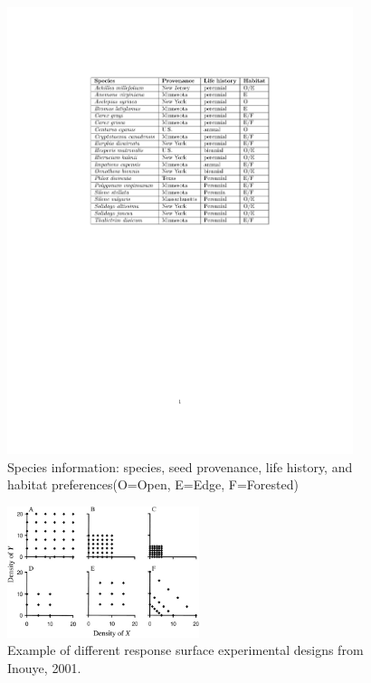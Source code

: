 \documentclass{article}\usepackage[]{graphicx}\usepackage[]{color}
\begin{document}
\begin{figure}[here]
\includegraphics[trim=50 400 50 100,clip,width=0.9\textwidth]{..//figures/species_table.pdf}
\caption{Species information: species, seed provenance, life history, and habitat preferences(O=Open, E=Edge, F=Forested)}
\label{fig:Figure 6}
\end{figure}

\begin{figure}[here]
\includegraphics[width=0.5\textwidth]{..//figures/response_surface.jpg}
\caption{Example of different response surface experimental designs from Inouye, 2001.}
\label{fig:Figure 7}
\end{figure}
\end{document}
